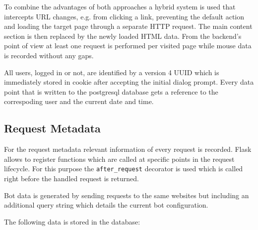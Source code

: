 \documentclass[
    fontsize=12pt,
    headings=small,
    parskip=half,           %
    bibliography=totoc,
    numbers=noenddot,       %
    open=any,               %
    final                   %
    ]{scrreprt}
\begin{document}
To combine the advantages of both approaches a hybrid system is used that intercepts URL changes, e.g. from clicking a link, preventing the default action and loading the target page through a separate HTTP request. The main content section is then replaced by the newly loaded HTML data. From the backend's point of view at least one request is performed per visited page while mouse data is recorded without any gaps.

All users, logged in or not, are identified by a version 4 UUID which is immediately stored in cookie after accepting the initial dialog prompt. Every data point that is written to the postgresql database gets a reference to the correspoding user and the current date and time.

\subsection{Request Metadata}

For the request metadata relevant information of every request is recorded. Flask allows to register functions which are called at specific points in the request lifecycle. For this purpose the \lstinline{after_request} decorator is used which is called right before the handled request is returned.

Bot data is generated by sending requests to the same websites but including an additional query string which details the current bot configuration.

The following data is stored in the database:
\end{document}

